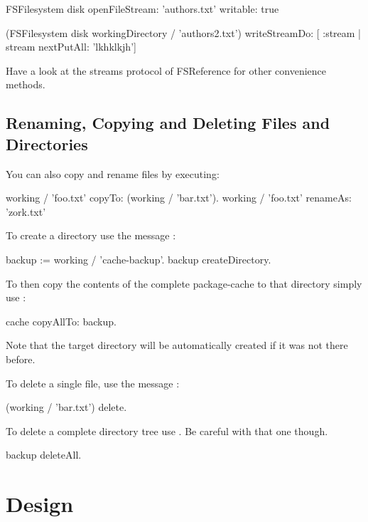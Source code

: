 \documentclass[a4paper,10pt,twoside]{book}
\begin{document}
\begin{code}{}
FSFilesystem disk 
	openFileStream: 'authors.txt' writable: true
	

(FSFilesystem disk workingDirectory / 'authors2.txt') 
	writeStreamDo: [ :stream | stream nextPutAll: 'lkhklkjh']
\end{code}
Have a look at the streams protocol of FSReference for other convenience methods.

\subsection{Renaming, Copying and Deleting Files and Directories}

You can also copy and rename files by executing:

\begin{code}{}
working / 'foo.txt' copyTo: (working / 'bar.txt').
working / 'foo.txt' renameAs: 'zork.txt'
\end{code} 


To create a directory use the message :

\begin{code}{}
backup := working / 'cache-backup'.
backup createDirectory.
\end{code} 

To then copy the contents of the complete package-cache to that directory simply use :

\begin{code}{}
 cache copyAllTo: backup.
\end{code}

Note that the target directory will be automatically created if it was not there before.



To delete a single file, use the message :
\begin{code}{}
 (working / 'bar.txt') delete.
\end{code}

To delete a complete directory tree use . Be careful with that one though.

\begin{code}
backup deleteAll.
\end{code}


\section{Design }
\end{document}
